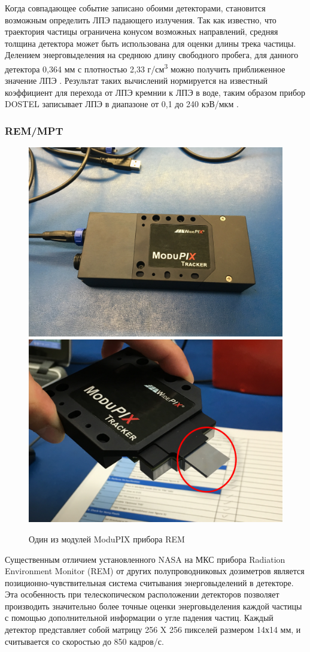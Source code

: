 Когда совпадающее событие записано обоими детекторами, становится возможным определить ЛПЭ падающего излучения. Так как известно, что траектория частицы ограничена конусом возможных направлений, средняя толщина детектора может быть использована для оценки длины трека частицы. Делением энерговыделения на среднюю длину свободного пробега, для данного детектора 0,364 мм \cite{Beaujean2002} с плотностью 2,33 г/см\textsuperscript{3}  можно получить приближенное значение ЛПЭ \cite{knoll2000radiation}. Результат таких вычислений нормируется на известный коэффициент для перехода от ЛПЭ кремнии к ЛПЭ в воде, таким образом прибор DOSTEL записывает ЛПЭ в диапазоне от 0,1 до 240 кэВ/мкм \cite{Beaujean2002}.


\subsubsection{REM/MPT}
\begin{figure}
	\centering
	\includegraphics[width=0.49\linewidth]{images/remmodupix}
	\includegraphics[width=0.49\linewidth]{images/modupix}
	\caption{Один из модулей ModuPIX прибора REM}
	\label{fig:modupix}
\end{figure}



Существенным отличием установленного NASA на МКС прибора Radiation Environment Monitor (REM) от других полупроводниковых дозиметров  является позиционно-чувствительная система считывания энерговыделений в детекторе. Эта особенность при телескопическом расположении детекторов позволяет производить значительно более точные оценки энерговыделения каждой частицы с помощью дополнительной информации о угле падения частиц. Каждый детектор представляет собой матрицу 256 X 256 пикселей размером 14х14 мм, и считывается со скоростью до 850 кадров/с.

